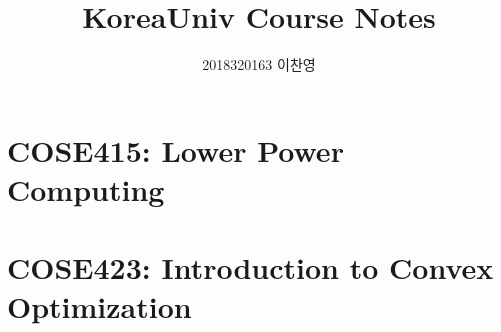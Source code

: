 \documentclass[a4paper,10pt,hidelinks]{book}
\title{KoreaUniv Course Notes}
\author{2018320163 이찬영}
\date{}
\begin{document}
    \maketitle
    \tableofcontents
    \setimgdir
    \chapter{COSE415: Lower Power Computing}
    \chapter{COSE423: Introduction to Convex Optimization}
\end{document}
